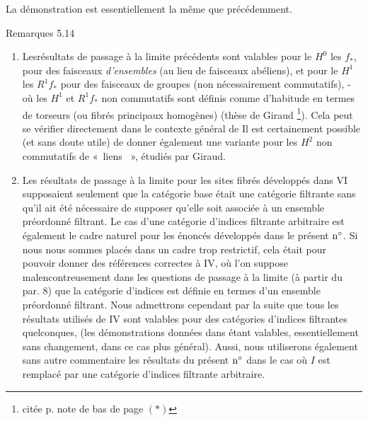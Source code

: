 \documentclass[10pt]{../fichiers-configuration-latex/smfart}
\begin{document}
La démonstration est essentiellement la même que précédemment.

\begin{enonce*}[remark]{Remarques 5.14}
\begin{enumerate}
\renewcommand{\theenumi}{\alph{enumi}}
\renewcommand{\labelenumi}{\theenumi)}
\item Les\pageoriginale résultats de passage à la limite précédents
  sont valables
pour le $H^{0}$ \resp les $f_{\ast}$, pour des faisceaux
\emph{d'ensembles} (au lieu de faisceaux abéliens), et pour le $H^{1}$
\resp les $R^1 f_{\ast}$ pour des faisceaux de groupes (non
nécessairement commutatifs), - où les $H^1$ et $R^1 f_{\ast}$ non
commutatifs sont définis comme d'habitude en termes de torseurs (ou
fibrés principaux homogènes) (\cf thèse de Giraud \footnote{citée p.
note de bas de page $(\ast)$}). Cela peut se vérifier directement dans
le contexte général de Il est certainement possible (et sans doute utile) de
donner également une variante pour les $H^2$ non commutatifs de « liens  », étudiés par Giraud.

\item Les résultats de passage à la limite pour les sites fibrés
développés dans VI supposaient seulement que la catégorie
base était
une catégorie filtrante sans qu'il ait été nécessaire
de supposer
qu'elle soit associée à un ensemble préordonné
filtrant. Le cas d'une
catégorie d'indices filtrante arbitraire est également le cadre
naturel pour les énoncés développés dans le
présent ${\rm n^{\circ}}$. Si nous
nous sommes placés dans un cadre trop restrictif, cela était pour
pouvoir donner des références correctes à \EGA IV, où
l'on suppose
malencontreusement dans les questions de passage à la limite (à partir
du par. 8) que la catégorie d'indices est définie en termes d'un
ensemble préordonné filtrant. Nous admettrons cependant par la suite
que tous les résultats utilisés de \EGA IV sont valables pour des
catégories d'indices filtrantes quelconques, (les démonstrations
données dans \loccit étant valables, essentiellement sans changement,
dans ce cas plus général). Aussi, nous utiliserons également sans
autre commentaire les résultats du présent ${\rm n^{\circ}}$
dans le cas où $I$
est remplacé par une catégorie d'indices filtrante arbitraire.
\end{enumerate}
\end{enonce*}

\ifx\danslelivre\undefined
\end{document}
